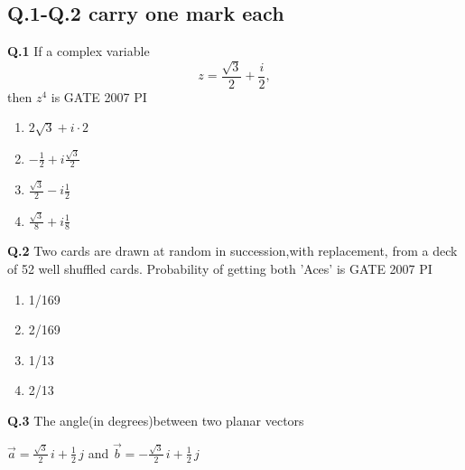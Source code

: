\documentclass[journal,12pt,onecolumn]{exam}
\theoremstyle{remark}
\begin{document}
\subsection{Q.1-Q.2 carry one mark each}
\noindent
\textbf{Q.1}
If a complex variable 
\[
z = \frac{\sqrt{3}}{2} + \frac{i}{2},
\]
then \( z^4 \) is
\hfill{GATE 2007 PI}
\begin{enumerate}
\item $2\sqrt{3} + i \cdot 2$
\item $-\frac{1}{2} + i \frac{\sqrt{3}}{2}$
\item $\frac{\sqrt{3}}{2} - i \frac{1}{2}$
\item $\frac{\sqrt{3}}{8} + i \frac{1}{8}$
\end{enumerate}



    
    
    \noindent
    \textbf{Q.2}
    Two cards are drawn at random in succession,with replacement, from a deck of 52 well shuffled cards. Probability of getting both 'Aces' is
    \hfill{GATE 2007 PI}
    \begin{enumerate}
        \item 1/169
        \item 2/169
        \item 1/13
        \item 2/13
    \end{enumerate}
    \noindent
    \textbf{Q.3}
    The angle(in degrees)between two planar vectors 
    
$\vec{a} = \frac{\sqrt{3}}{2} \, i + \frac{1}{2} \, j$
and $\vec{b} = -\frac{\sqrt{3}}{2} \, i + \frac{1}{2} \, j$
\end{document}
